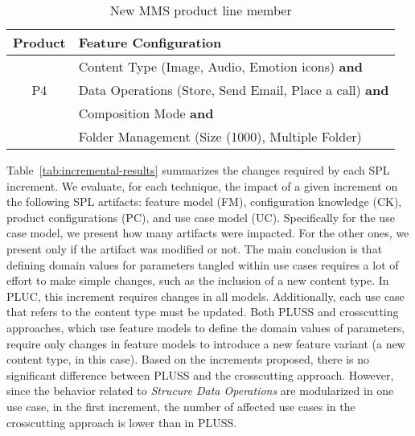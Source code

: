 \documentclass{acm_proc_article-sp}
\begin{document}
\begin{table}[hb]
\centering
\caption{New MMS product line member}
\label{tab:new-product}
\begin{small}
\begin{tabular}{|c|l|} \hline
Product & Feature Configuration \\ \hline
      & Content Type (Image, Audio, Emotion icons) {\bf and} \\ 
 P4 & Data Operations (Store, Send Email, Place a call) {\bf and}\\
      & Composition Mode {\bf and} \\
      & Folder Management (Size (1000), Multiple Folder)  \\ \hline 
\end{tabular}
\end{small}
\end{table}

Table~\ref{tab:incremental-results} summarizes the changes required by each SPL increment. We evaluate, for each technique, 
the impact of a given increment on  the following SPL artifacts: feature model (FM), configuration knowledge (CK), product configurations (PC), and use case model (UC). Specifically for the use case model, we present how many artifacts were impacted. For the other ones, we present only if the artifact was modified or not. 
The main conclusion is that defining domain values for parameters tangled within use cases requires a lot of effort to make simple 
changes, such as the inclusion of a new content type. In PLUC, this increment requires changes in all models. Additionally, each use 
case that refers to the content type must be updated.  Both PLUSS and crosscutting approaches, which use feature models to define 
the domain values of parameters, require only changes in feature models to introduce a new feature variant (a new content type, in 
this case). Based on the increments proposed, there is no significant difference between PLUSS and the crosscutting approach. However, since the behavior related to \emph{Strucure Data Operations} are modularized in one use case, in the
first increment, the number of affected use cases in the crosscutting approach is lower than in PLUSS. 
\end{document}
